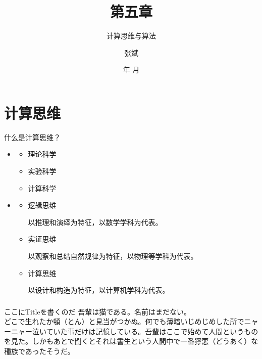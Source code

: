 \documentclass[dvipsnames, svgnames, x11names]{beamer}
\title{第五章}
\subtitle{计算思维与算法}
\author{张斌}
\institute{理工系}
\date{\the\year 年 \the\month 月}
\begin{document}
  

\begin{frame}
  \titlepage
  \thispagestyle{empty}
  \addtocounter{framenumber}{-1}
\end{frame}

\begin{frame}{}
  \begin{center}
      {\Huge {}}
  \end{center}
  \tableofcontents[subsectionstyle=hide/hide/show]
  \thispagestyle{empty}
  \addtocounter{framenumber}{-1}
\end{frame}

\section{计算思维}

\begin{frame}{什么是计算思维？}
\begin{itemize}                                                   
  \item {}
    \begin{itemize}
      \item 理论科学
      \item 实验科学
      \item 计算科学
    \end{itemize}
  \item {}
    \begin{itemize}
      \item 逻辑思维
      
      以推理和演绎为特征，以数学学科为代表。
      
      \item 实证思维
      
      以观察和总结自然规律为特征，以物理等学科为代表。
      \item 计算思维
      
      以设计和构造为特征，以计算机学科为代表。
    \end{itemize}
\end{itemize}
\end{frame}

\begin{frame}
    \frametitle{}
    \begin{boxmine}{ここにTitleを書くのだ}
      吾輩は猫である。名前はまだない。\\
      どこで生れたか頓（とん）と見当がつかぬ。何でも薄暗いじめじめした所でニャーニャー泣いていた事だけは記憶している。吾輩はここで始めて人間というものを見た。しかもあとで聞くとそれは書生という人間中で一番獰悪（どうあく）な種族であったそうだ。
      \end{boxmine}
\end{frame}
\end{document}

